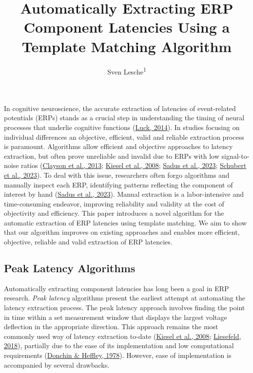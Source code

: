 \documentclass[
  man]{apa7}
\title{Automatically Extracting ERP Component Latencies Using a Template Matching Algorithm}
\author{Sven Lesche\textsuperscript{1}}
\date{}
\affiliation{\vspace{0.5cm}\textsuperscript{1} Ruprecht-Karls-University Heidelberg}
\begin{document}
\maketitle

In cognitive neuroscience, the accurate extraction of latencies of event-related potentials (ERPs) stands as a crucial step in understanding the timing of neural processes that underlie cognitive functions (\protect\hyperlink{ref-luck2014introduction}{Luck, 2014}). In studies focusing on individual differences an objective, efficient, valid and reliable extraction process is paramount. Algorithms allow efficient and objective approaches to latency extraction, but often prove unreliable and invalid due to ERPs with low signal-to-noise ratios (\protect\hyperlink{ref-clayson2013noise}{Clayson et al., 2013}; \protect\hyperlink{ref-kiesel2008measurement}{Kiesel et al., 2008}; \protect\hyperlink{ref-sadus2023multiverse}{Sadus et al., 2023}; \protect\hyperlink{ref-schubert2023robust}{Schubert et al., 2023}). To deal with this issue, researchers often forgo algorithms and manually inspect each ERP, identifying patterns reflecting the component of interest by hand (\protect\hyperlink{ref-sadus2023multiverse}{Sadus et al., 2023}). Manual extraction is a labor-intensive and time-consuming endeavor, improving reliability and validity at the cost of objectivity and efficiency. This paper introduces a novel algorithm for the automatic extraction of ERP latencies using template matching. We aim to show that our algorithm improves on existing approaches and enables more efficient, objective, reliable and valid extraction of ERP latencies.

\hypertarget{peak-latency-algorithms}{%
\subsection{Peak Latency Algorithms}\label{peak-latency-algorithms}}

Automatically extracting component latencies has long been a goal in ERP research. \emph{Peak latency} algorithms present the earliest attempt at automating the latency extraction process. The peak latency approach involves finding the point in time within a set measurement window that displays the largest voltage deflection in the appropriate direction. This approach remains the most commonly used way of latency extraction to-date (\protect\hyperlink{ref-kiesel2008measurement}{Kiesel et al., 2008}; \protect\hyperlink{ref-liesefeld2018estimating}{Liesefeld, 2018}), partially due to the ease of its implementation and low computational requirements (\protect\hyperlink{ref-donchin1978multivariate}{Donchin \& Heffley, 1978}). However, ease of implementation is accompanied by several drawbacks.
\end{document}

